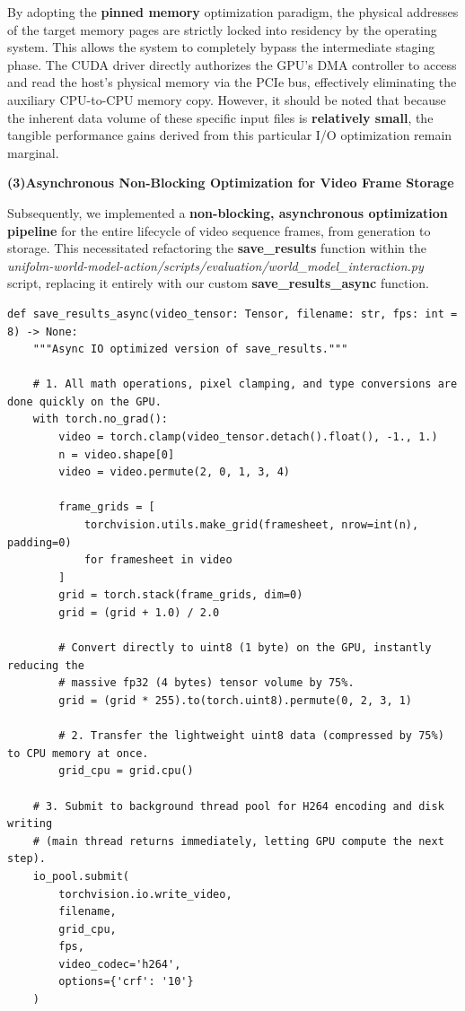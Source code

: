 By adopting the \textbf{pinned memory} optimization paradigm, the physical addresses of the target memory pages are strictly locked into residency by the operating system. 
This allows the system to completely bypass the intermediate staging phase. 
The CUDA driver directly authorizes the GPU's DMA controller to access and read the host's physical memory via the PCIe bus, effectively eliminating the auxiliary CPU-to-CPU memory copy. 
However, it should be noted that because the inherent data volume of these specific input files is \textbf{relatively small}, the tangible performance gains derived from this particular I/O optimization remain marginal.


\textbf{(3)Asynchronous Non-Blocking Optimization for Video Frame Storage}

Subsequently, we implemented a \textbf{non-blocking, asynchronous optimization pipeline} for the entire lifecycle of video sequence frames, from generation to storage. This necessitated refactoring the \textbf{save\_results} function within the \emph{unifolm-world-model-action/scripts/evaluation/world\_model\_interaction.py} script, replacing it entirely with our custom \textbf{save\_results\_async} function.

\begin{lstlisting}
def save_results_async(video_tensor: Tensor, filename: str, fps: int = 8) -> None:
    """Async IO optimized version of save_results."""
    
    # 1. All math operations, pixel clamping, and type conversions are done quickly on the GPU.
    with torch.no_grad():
        video = torch.clamp(video_tensor.detach().float(), -1., 1.)
        n = video.shape[0]
        video = video.permute(2, 0, 1, 3, 4)
        
        frame_grids = [
            torchvision.utils.make_grid(framesheet, nrow=int(n), padding=0)
            for framesheet in video
        ]
        grid = torch.stack(frame_grids, dim=0)
        grid = (grid + 1.0) / 2.0
        
        # Convert directly to uint8 (1 byte) on the GPU, instantly reducing the
        # massive fp32 (4 bytes) tensor volume by 75%.
        grid = (grid * 255).to(torch.uint8).permute(0, 2, 3, 1)
        
        # 2. Transfer the lightweight uint8 data (compressed by 75%) to CPU memory at once.
        grid_cpu = grid.cpu()

    # 3. Submit to background thread pool for H264 encoding and disk writing
    # (main thread returns immediately, letting GPU compute the next step).
    io_pool.submit(
        torchvision.io.write_video,
        filename,
        grid_cpu,
        fps,
        video_codec='h264',
        options={'crf': '10'}
    )
\end{lstlisting}

